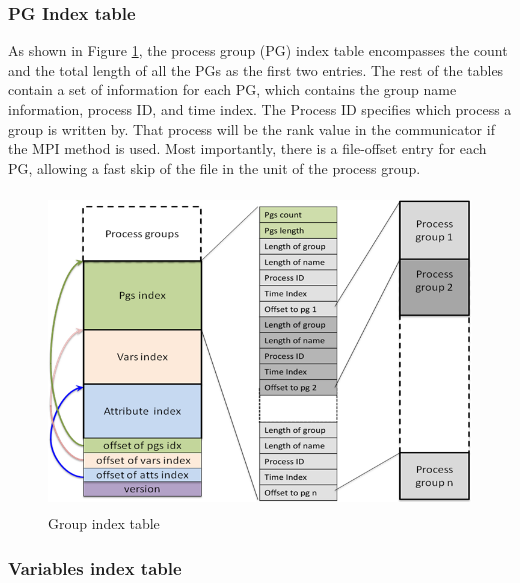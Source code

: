\subsubsection{PG Index table}

As shown in Figure \ref{fig:group-index-table}, 
the process group (PG) index table encompasses the count 
and the total length of all the PGs as the first two entries. The rest of the tables 
contain a set of information for each PG, which contains the group name information, 
process ID, and time index. The Process ID specifies which process a group is written 
by. That process will be the rank value in the communicator if the MPI method is 
used. Most importantly, there is a file-offset entry for each PG, allowing a fast 
skip of the file in the unit of the process group.

\begin{figure}[htbp]
\begin{center}
\includegraphics[width=338pt, height=238pt]{figures/group-index-table.png}
\caption{Group index table}
\label{fig:group-index-table}
\end{center}
\end{figure}

\subsubsection{Variables index table}

